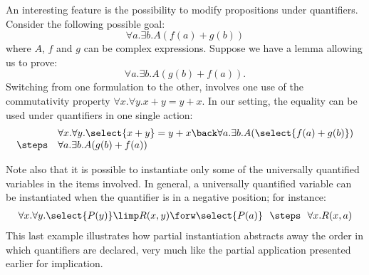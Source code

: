 An interesting feature is the possibility to modify propositions under
quantifiers. Consider the following possible goal:
$$\forall a.\exists b. A(f(a)+g(b))$$
where $A$, $f$ and $g$ can be complex expressions. Suppose we have a
lemma allowing us to prove:
$$\forall a.\exists b. A(g(b)+ f(a)).$$
Switching from one formulation to the other, involves one use of the
commutativity property $\forall x.\forall y. x+y=y+x$.
In our setting, the equality can be used under quantifiers in one single action:
$$
\begin{array}{ll}
  &\forall x.\forall y. \select{x+y}=y+x \back \forall a.\exists b. A(\select{f(a)+g(b)})\\
\steps & \forall a.\exists b. A(g(b)+f(a))
\end{array}$$


Note also that it is possible to instantiate only some of the universally
quantified variables in the items involved. In general, a universally
quantified variable can be instantiated when the quantifier is in a
negative position; for instance:
$$
\begin{array}{rcl}
 \forall x.\forall
 y. \select{P(y)}\limp R(x,y)\forw \select{P(a)} ~\/~\steps
~\/~ \forall x. R(x,a)
\end{array}
$$
This last example illustrates how partial instantiation abstracts away the order
in which quantifiers are declared, very much like the partial application
presented earlier for implication.


